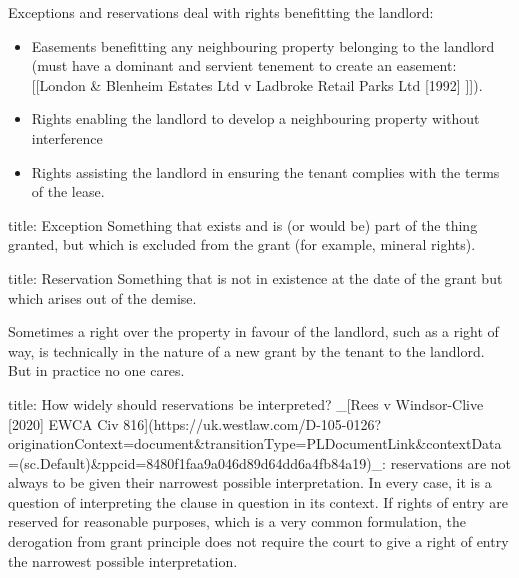 \documentclass[
]{article}
\newenvironment{Shaded}{}{}
\newcommand{\NormalTok}[1]{#1}
\providecommand{\tightlist}{%
  \setlength{\itemsep}{0pt}\setlength{\parskip}{0pt}}
\begin{document}
Exceptions and reservations deal with rights benefitting the landlord:

\begin{itemize}
\tightlist
\item
  Easements benefitting any neighbouring property belonging to the
  landlord (must have a dominant and servient tenement to create an
  easement: {[}{[}London \& Blenheim Estates Ltd v Ladbroke Retail Parks
  Ltd {[}1992{]} {]}{]}).
\item
  Rights enabling the landlord to develop a neighbouring property
  without interference
\item
  Rights assisting the landlord in ensuring the tenant complies with the
  terms of the lease.
\end{itemize}

\begin{Shaded}
\begin{Highlighting}[]
\NormalTok{title: Exception}
\NormalTok{Something that exists and is (or would be) part of the thing granted, but which is excluded from the grant (for example, mineral rights).}
\end{Highlighting}
\end{Shaded}

\begin{Shaded}
\begin{Highlighting}[]
\NormalTok{title: Reservation}
\NormalTok{Something that is not in existence at the date of the grant but which arises out of the demise.}
\end{Highlighting}
\end{Shaded}

Sometimes a right over the property in favour of the landlord, such as a
right of way, is technically in the nature of a new grant by the tenant
to the landlord. But in practice no one cares.

\begin{Shaded}
\begin{Highlighting}[]
\NormalTok{title: How widely should reservations be interpreted?}
\NormalTok{\_[Rees v Windsor{-}Clive [2020] EWCA Civ 816](https://uk.westlaw.com/D{-}105{-}0126?originationContext=document\&transitionType=PLDocumentLink\&contextData=(sc.Default)\&ppcid=8480f1faa9a046d89d64dd6a4fb84a19)\_: reservations are not always to be given their narrowest possible interpretation. In every case, it is a question of interpreting the clause in question in its context. If rights of entry are reserved for reasonable purposes, which is a very common formulation, the derogation from grant principle does not require the court to give a right of entry the narrowest possible interpretation.}
\end{Highlighting}
\end{Shaded}
\end{document}
